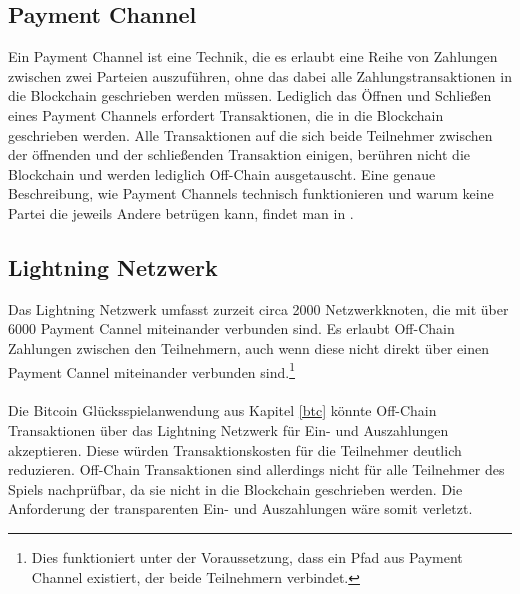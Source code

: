 \subsection{Payment Channel}

Ein Payment Channel ist eine Technik, die es erlaubt eine Reihe von Zahlungen zwischen zwei Parteien auszuführen, ohne das dabei alle Zahlungstransaktionen in die Blockchain geschrieben werden müssen. Lediglich das Öffnen und Schließen eines Payment Channels erfordert Transaktionen, die in die Blockchain geschrieben werden. Alle Transaktionen auf die sich beide Teilnehmer zwischen der öffnenden und der schließenden Transaktion einigen, berühren nicht die Blockchain und werden lediglich Off-Chain ausgetauscht. Eine genaue Beschreibung, wie Payment Channels technisch funktionieren und warum keine Partei die jeweils Andere betrügen kann, findet man in \cite{lightning_white_paper}.

\subsection{Lightning Netzwerk}

Das Lightning Netzwerk umfasst zurzeit circa 2000 Netzwerkknoten, die mit über 6000 Payment Cannel miteinander verbunden sind. Es erlaubt Off-Chain Zahlungen zwischen den Teilnehmern, auch wenn diese nicht direkt über einen Payment Cannel miteinander verbunden sind.\footnote{Dies funktioniert unter der Voraussetzung, dass ein Pfad aus Payment Channel existiert, der beide Teilnehmern verbindet.} \\\\
Die Bitcoin Glücksspielanwendung aus Kapitel \ref{btc} könnte Off-Chain Transaktionen über das Lightning Netzwerk für Ein- und Auszahlungen akzeptieren. Diese würden Transaktionskosten für die Teilnehmer deutlich reduzieren. Off-Chain Transaktionen sind allerdings nicht für alle Teilnehmer des Spiels nachprüfbar, da sie nicht in die Blockchain geschrieben werden. Die Anforderung der transparenten Ein- und Auszahlungen wäre somit verletzt.